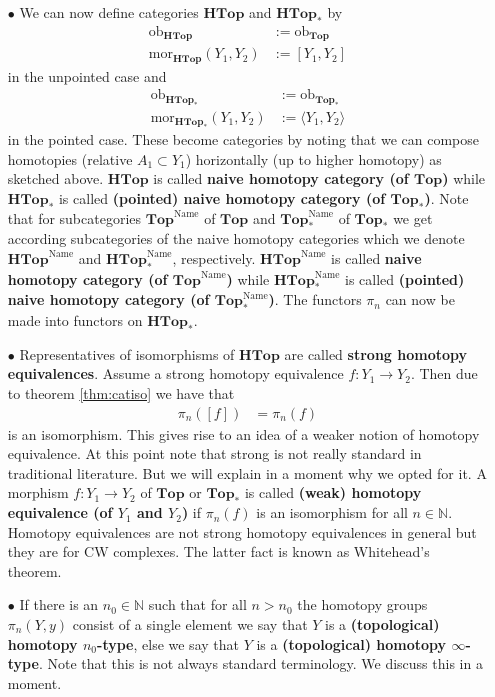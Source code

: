 \begin{enumerate}
\item[$\bullet$]
We can now define categories $\mathbf{HTop}$ and $\mathbf{HTop}_{\ast}$ by
\begin{align*}
  \mathrm{ob}_{\mathbf{HTop}}
  &:=
  \mathrm{ob}_{\mathbf{Top}}
  \\
  \mathrm{mor}_{\mathbf{HTop}}(Y_{1},Y_{2})
  &:=
  [Y_{1},Y_{2}]
\end{align*}
in the unpointed case and
\begin{align*}
  \mathrm{ob}_{\mathbf{HTop}_{\ast}}
  &:=
  \mathrm{ob}_{\mathbf{Top}_{\ast}}
  \\
  \mathrm{mor}_{\mathbf{HTop}_{\ast}}(Y_{1},Y_{2})
  &:=
  \langle
    Y_{1},
    Y_{2}
  \rangle
\end{align*}
in the pointed case. These become categories by noting that we can compose homotopies (relative $A_{1} \subset Y_{1}$) horizontally (up to higher homotopy) as sketched above. $\mathbf{HTop}$ is called \textbf{naive homotopy category (of $\mathbf{Top}$)} while $\mathbf{HTop}_{\ast}$ is called \textbf{(pointed) naive homotopy category (of $\mathbf{Top}_{\ast}$)}. Note that for subcategories $\mathbf{Top}^{\textrm{Name}}$ of $\mathbf{Top}$ and $\mathbf{Top}_{\ast}^{\textrm{Name}}$ of $\mathbf{Top}_{\ast}$ we get according subcategories of the naive homotopy categories which we denote $\mathbf{HTop}^{\textrm{Name}}$ and $\mathbf{HTop}_{\ast}^{\textrm{Name}}$, respectively. $\mathbf{HTop}^{\textrm{Name}}$ is called \textbf{naive homotopy category (of $\mathbf{Top}^{\mathrm{Name}}$)} while $\mathbf{HTop}_{\ast}^{\textrm{Name}}$ is called \textbf{(pointed) naive homotopy category (of $\mathbf{Top}_{\ast}^{\mathrm{Name}}$)}. The functors $\pi_{n}$ can now be made into functors on $\mathbf{HTop}_{\ast}$.
\item[$\bullet$]
Representatives of isomorphisms of $\mathbf{HTop}$ are called \textbf{strong homotopy equivalences}. Assume a strong homotopy equivalence $f \colon Y_{1} \rightarrow Y_{2}$. Then due to theorem \ref{thm:catiso} we have that
\begin{align*}
  \pi_{n}([f])
  &=
  \pi_{n}(f)
\end{align*}
is an isomorphism. This gives rise to an idea of a weaker notion of homotopy equivalence. At this point note that {\glqq}strong{\grqq} is not really standard in traditional literature. But we will explain in a moment why we opted for it. A morphism $f \colon Y_{1} \rightarrow Y_{2}$ of $\mathbf{Top}$ or $\mathbf{Top}_{\ast}$ is called \textbf{(weak) homotopy equivalence (of $Y_{1}$ and $Y_{2}$)} if $\pi_{n}(f)$ is an isomorphism for all $n \in \mathbb{N}$. Homotopy equivalences are not strong homotopy equivalences in general but they are for CW complexes. The latter fact is known as Whitehead's theorem.
\item[$\bullet$]
If there is an $n_{0} \in \mathbb{N}$ such that for all $n > n_{0}$ the homotopy groups $\pi_{n}(Y,y)$ consist of a single element we say that $Y$ is a \textbf {(topological) homotopy $n_{0}$-type}, else we say that $Y$ is a \textbf{(topological) homotopy $\infty$-type}. Note that this is not always standard terminology. We discuss this in a moment.
\end{enumerate}
